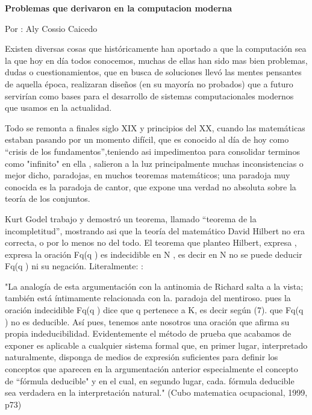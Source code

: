 \documentclass[15pt]{article}
\begin{document}
\begin{center}

\bf{\sc\Huge Problemas que derivaron en la computacion moderna }\\
\end{center}

Por : Aly Cossio Caicedo
\large

\vspace{15PT}
Existen diversas cosas que históricamente han aportado a que la computación sea la que hoy en día todos conocemos, muchas de ellas han sido mas bien problemas, dudas o cuestionamientos, que en busca de soluciones llevó las mentes pensantes de aquella época, realizaran diseños (en su mayoría no probados) que a futuro servirían como bases para el desarrollo de sistemas computacionales modernos que usamos en la actualidad.

\vspace{15PT}
Todo se remonta a finales siglo XIX y principios del XX, cuando las matemáticas estaban pasando por un momento difícil, que es conocido al día de hoy como “crisis de los fundamentos”,teniendo asi impedimentoa para consolidar  terminos como  "infinito" en ella ,  salieron a la luz principalmente muchas inconsistencias o mejor dicho, paradojas, en muchos teoremas matemáticos; una paradoja muy conocida es la paradoja de cantor, que expone una verdad no absoluta sobre la teoría de los conjuntos.

\vspace{15PT}
Kurt Godel trabajo y demostró un teorema, llamado “teorema de la incompletitud”, mostrando asi que la teoría del matemático David Hilbert no era correcta, o por lo menos no del todo. El teorema que planteo Hilbert, expresa , expresa la oración Fq(q ) es indecidible en N , es decir en N no se puede deducir Fq(q ) ni su negación. Literalmente: :

"La analogía de esta argumentación con la antinomia de Richard salta a la vista; también está íntimamente relacionada con la. paradoja del mentiroso. pues la oración indecidible Fq(q ) dice que q pertenece a K, es decir según (7). que Fq(q ) no es deducible. Así pues, tenemos ante nosotros una oración que afirma su propia indeducibilidad. Evidentemente el método de prueba que acabamos de exponer es aplicable a cualquier sistema formal que, en primer lugar, interpretado naturalmente, disponga de medios de expresión suficientes para definir los conceptos que aparecen en la argumentación anterior especialmente el concepto de “fórmula deducible" y en el cual, en segundo lugar, cada. fórmula deducible sea verdadera en la interpretación natural."
(Cubo matematica ocupacional, 1999, p73) 
\end{document}
